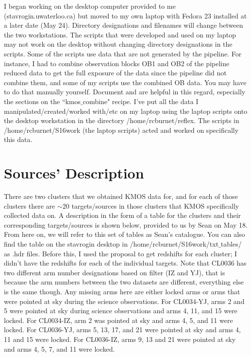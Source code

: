 \documentclass[10pt,letterpaper]{article}
\begin{document}
I began working on the desktop computer provided to me (stavrogin.uwaterloo.ca) but moved to my own laptop with Fedora 23 installed at a later date (May 24). Directory designations and filenames will change between the two workstations. The scripts that were developed and used on my laptop may not work on the desktop without changing directory designations in the scripts. Some of the scripts use data that are not generated by the pipeline. For instance, I had to combine observation blocks OB1 and OB2 of the pipeline reduced data to get the full exposure of the data since the pipeline did not combine them, and some of my scripts use the combined OB data. You may have to do that manually yourself. Document \cite{KMOS pipeline manual} and \cite{KMOS pipeline cookbook} are helpful in this regard, especially the sections on the ``kmos$\_$combine" recipe. I've put all the data I manipulated/created/worked with/etc on my laptop using the laptop scripts onto the desktop workstation in the directory /home/rcburnet/reflex. The scripts in /home/rcburnet/S16work (the laptop scripts) acted and worked on specifically this data.\\

\newpage

\section{Sources' Description}
\label{sec:sources}
There are two clusters that we obtained KMOS data for, and for each of those clusters there are $\sim$20 targets/sources in those clusters that KMOS specifically collected data on. A description in the form of a table for the clusters and their corresponding targets/sources is shown below, provided to us by Sean on May 18. From here on, we will refer to this set of tables as Sean's catalogue. You can also find the table on the stavrogin desktop in /home/rcburnet/S16work/txt$\_$tables/ as .hdr files. Before this, I used the proposal to get redshifts for each cluster; I didn't have the redshifts for each of the individual targets. Note that CL0036 has two different arm number designations based on filter (IZ and YJ), that is because the arm numbers between the two datasets are different, everything else is the same though. Any missing arms here are either locked arms or arms that were pointed at sky during the science observations. For CL0034-YJ, arms 2 and 5 were pointed at sky during science observations and arms 4, 11, and 15 were locked. For CL0034-IZ, arm 2 was pointed at sky and arms 4, 5, and 11 were locked. For CL0036-YJ, arms 5, 13, 17, and 21 were pointed at sky and arms 4, 11 and 15 were locked. For CL0036-IZ, arms 9, 13 and 21 were pointed at sky and arms 4, 5, 7, and 11 were locked.\\
\end{document}
